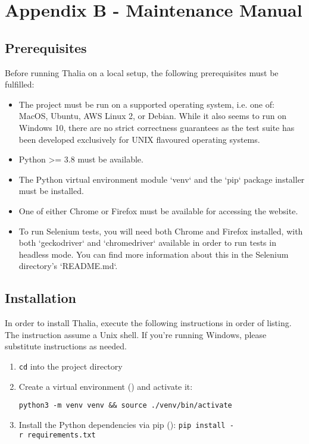 \documentclass[main.tex]{subfiles}
\begin{document}
\section{Appendix B - Maintenance Manual}
\label{maintance-manual}
\label{MaintenanceManual}

\subsection{Prerequisites}
\label{prerequisits-for-running-thalia}

Before running Thalia on a local setup, the following prerequisites must be fulfilled:

\begin{itemize}
\item
  The project must be run on a supported operating system, i.e. one of: MacOS, Ubuntu, AWS Linux 2, or Debian. While it also seems to run on Windows 10, there are no strict correctness guarantees as the test suite has been developed exclusively for UNIX flavoured operating systems.
\item
  Python \textgreater= 3.8 must be available.
\item
  The Python virtual environment module `venv` and the `pip` package installer must be installed.
\item
  One of either Chrome or Firefox must be available for accessing the website.
\item
  To run Selenium tests, you will need both Chrome and Firefox installed, with both `geckodriver` and `chromedriver` available in order to run tests in headless mode.
  You can find more information about this in the Selenium directory's `README.md`.
\end{itemize}

\subsection{Installation}
\label{installation-instructions}

In order to install Thalia, execute the following instructions in order of listing. The instruction assume a Unix shell. If you're running Windows, please substitute instructions as needed.

\begin{enumerate}

\item
  \texttt{cd} into the project directory
\item
  Create a virtual environment () and activate it: \newline
  
  \texttt{python3\ -m\ venv\ venv\ \&\&\ source\ ./venv/bin/activate}
\item Install the Python dependencies via pip
():
\newline
  \texttt{pip\ install\ -r\ requirements.txt}
\end{enumerate}
\end{document}
